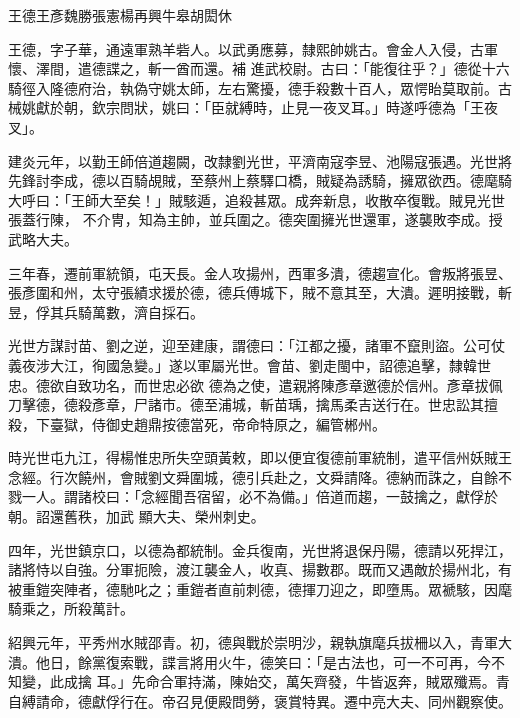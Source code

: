 
\begin{pinyinscope}

 王德王彥魏勝張憲楊再興牛皋胡閎休



 王德，字子華，通遠軍熟羊砦人。以武勇應募，隸熙帥姚古。會金人入侵，古軍懷、澤間，遣德諜之，斬一酋而還。補
 進武校尉。古曰：「能復往乎？」德從十六騎徑入隆德府治，執偽守姚太師，左右驚擾，德手殺數十百人，眾愕眙莫取前。古械姚獻於朝，欽宗問狀，姚曰：「臣就縛時，止見一夜叉耳。」時遂呼德為「王夜叉」。



 建炎元年，以勤王師倍道趨闕，改隸劉光世，平濟南寇李昱、池陽寇張遇。光世將先鋒討李成，德以百騎覘賊，至蔡州上蔡驛口橋，賊疑為誘騎，擁眾欲西。德麾騎大呼曰：「王師大至矣！」賊駭遁，追殺甚眾。成奔新息，收散卒復戰。賊見光世張蓋行陳，
 不介冑，知為主帥，並兵圍之。德突圍擁光世還軍，遂襲敗李成。授武略大夫。



 三年春，遷前軍統領，屯天長。金人攻揚州，西軍多潰，德趨宣化。會叛將張昱、張彥圍和州，太守張績求援於德，德兵傅城下，賊不意其至，大潰。遲明接戰，斬昱，俘其兵騎萬數，濟自採石。



 光世方謀討苗、劉之逆，迎至建康，謂德曰：「江都之擾，諸軍不竄則盜。公可仗義夜涉大江，徇國急變。」遂以軍屬光世。會苗、劉走閩中，詔德追擊，隸韓世忠。德欲自致功名，而世忠必欲
 德為之使，遣親將陳彥章邀德於信州。彥章拔佩刀擊德，德殺彥章，尸諸市。德至浦城，斬苗瑀，擒馬柔吉送行在。世忠訟其擅殺，下臺獄，侍御史趙鼎按德當死，帝命特原之，編管郴州。



 時光世屯九江，得楊惟忠所失空頭黃敕，即以便宜復德前軍統制，遣平信州妖賊王念經。行次饒州，會賊劉文舜圍城，德引兵赴之，文舜請降。德納而誅之，自餘不戮一人。謂諸校曰：「念經聞吾宿留，必不為備。」倍道而趨，一鼓擒之，獻俘於朝。詔還舊秩，加武
 顯大夫、榮州刺史。



 四年，光世鎮京口，以德為都統制。金兵復南，光世將退保丹陽，德請以死捍江，諸將恃以自強。分軍扼險，渡江襲金人，收真、揚數郡。既而又遇敵於揚州北，有被重鎧突陣者，德馳叱之；重鎧者直前刺德，德揮刀迎之，即墮馬。眾褫駭，因麾騎乘之，所殺萬計。



 紹興元年，平秀州水賊邵青。初，德與戰於崇明沙，親執旗麾兵拔柵以入，青軍大潰。他日，餘黨復索戰，諜言將用火牛，德笑曰：「是古法也，可一不可再，今不知變，此成擒
 耳。」先命合軍持滿，陳始交，萬矢齊發，牛皆返奔，賊眾殲焉。青自縛請命，德獻俘行在。帝召見便殿問勞，褒賞特異。遷中亮大夫、同州觀察使。




\end{pinyinscope}
